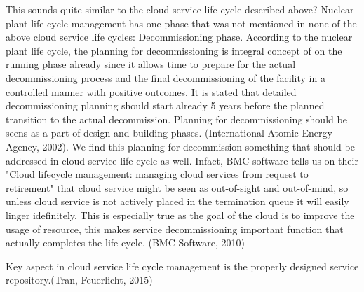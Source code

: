 \documentclass{article}
\begin{document}
\par
This sounds quite similar to the cloud service life cycle described above? Nuclear plant life cycle management has one phase that was not mentioned in none of the above cloud service life cycles: Decommissioning phase. According to the nuclear plant life cycle, the planning for decommissioning is integral concept of on the running phase already since it allows time to prepare for the actual decommissioning process and the final decommissioning of the facility in a controlled manner with positive outcomes. It is stated that detailed decommissioning planning should start already 5 years before the planned transition to the actual decommission. Planning for decommissioning should be seens as a part of design and building phases. (International Atomic Energy Agency, 2002). We find this planning for decommission something that should be addressed in cloud service life cycle as well. Infact, BMC software tells us on their "Cloud lifecycle management: managing cloud services from request to retirement" that cloud service might be seen as out-of-sight and out-of-mind, so unless cloud service is not actively placed in the termination queue it will easily linger idefinitely. This is especially true as the goal of the cloud is to improve the usage of resource, this makes service decommissioning important function that actually completes the life cycle. (BMC Software, 2010)
\par 
Key aspect in cloud service life cycle management is the properly designed service repository.(Tran, Feuerlicht, 2015)
\end{document}
